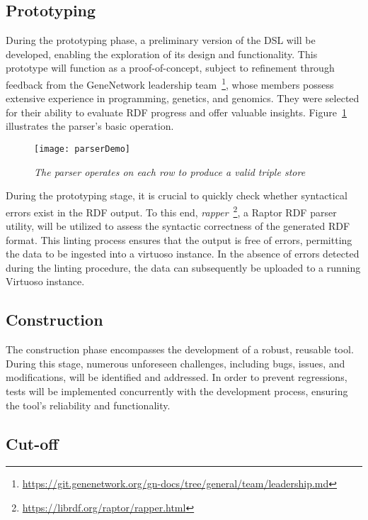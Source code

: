 \subsection{Prototyping}

During the prototyping phase, a preliminary version of the DSL will be developed, enabling the exploration of its design and functionality.  This prototype will function as a proof-of-concept, subject to refinement through feedback from the GeneNetwork leadership team~\footnote{\url{https://git.genenetwork.org/gn-docs/tree/general/team/leadership.md}}, whose members possess extensive experience in programming, genetics, and genomics.  They were selected for their ability to evaluate RDF progress and offer valuable insights.  Figure~\ref{fig:parser-demo} illustrates the parser's basic operation.

\begin{figure}[H]
\centering
\texttt{[image: parserDemo]}
\caption{\textit{The parser operates on each row to produce a valid triple store}}\label{fig:parser-demo}
\centering
\end{figure}

During the prototyping stage, it is crucial to quickly check whether syntactical errors exist in the RDF output.  To this end, \textit{rapper}~\footnote{\url{https://librdf.org/raptor/rapper.html}}, a Raptor RDF parser utility, will be utilized to assess the syntactic correctness of the generated RDF format.  This linting process ensures that the output is free of errors, permitting the data to be ingested into a virtuoso instance.  In the absence of errors detected during the linting procedure, the data can subsequently be uploaded to a running Virtuoso instance.

\subsection{Construction}

The construction phase encompasses the development of a robust, reusable tool.  During this stage, numerous unforeseen challenges, including bugs, issues, and modifications, will be identified and addressed.  In order to prevent regressions, tests will be implemented concurrently with the development process, ensuring the tool's reliability and functionality.

\subsection{Cut-off}

